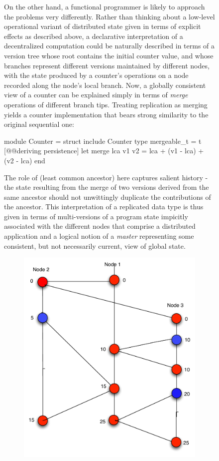 \begin{figure}
On the other hand, a functional programmer is likely to approach the
problems very differently.  Rather than thinking about a low-level
operational variant of distributed state given in terms of explicit
effects as described above, a declarative interpretation of a
decentralized computation could be naturally described in terms of a
version tree whose root contains the initial counter value, and whose
branches represent different versions maintained by different nodes,
with the state produced by a counter's operations on a node recorded
along the node's local branch.  Now, a globally consistent view of a
counter can be explained simply in terms of \emph{merge} operations of
different branch tips.  Treating replication as merging yields a
counter implementation that bears strong similarity to the original
sequential one:
  \begin{ocaml}
    module Counter = struct
      include Counter
      type mergeable_t = t [@@deriving persistence]
      let merge lca v1 v2 = lca + (v1 - lca) + (v2 - lca)
    end
  \end{ocaml}
The role of  (least common ancestor) here captures salient
history - the state resulting from the merge of two versions derived
from the same ancestor should not unwittingly duplicate the
contributions of the ancestor.  This interpretation of a replicated
data type is thus given in terms of multi-versions of a program state
impicitly associated with the different nodes that comprise a
distributed application and a logical notion of a \emph{master}
representing some consistent, but not necessarily current, view of
global state.  
\begin{figure}
  \begin{center}
    \includegraphics[scale=0.4]{Figures/dali-counter}

\end{center}
\end{figure}
\end{figure}

